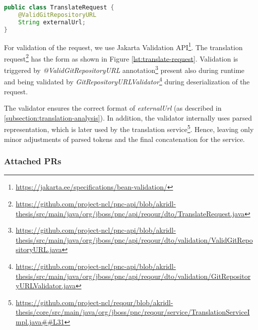 \documentclass[../main.tex]{subfiles}
\begin{document}
\begin{lstlisting}[language=Java, caption=Translate request, label={lst:translate-request}, numbers=none]
public class TranslateRequest {
    @ValidGitRepositoryURL
    String externalUrl;
}
\end{lstlisting}

For validation of the request, we use Jakarta Validation API\footnote{\url{https://jakarta.ee/specifications/bean-validation/}}. The translation request\footnote{\url{https://github.com/project-ncl/pnc-api/blob/akridl-thesis/src/main/java/org/jboss/pnc/api/reqour/dto/TranslateRequest.java}} has the form as shown in Figure \ref{lst:translate-request}. Validation is triggered by \textit{@ValidGitRepositoryURL} annotation\footnote{\url{https://github.com/project-ncl/pnc-api/blob/akridl-thesis/src/main/java/org/jboss/pnc/api/reqour/dto/validation/ValidGitRepositoryURL.java}} present also during runtime and being validated by \textit{GitRepositoryURLValidator}\footnote{\url{https://github.com/project-ncl/pnc-api/blob/akridl-thesis/src/main/java/org/jboss/pnc/api/reqour/dto/validation/GitRepositoryURLValidator.java}} during deserialization of the request.

The validator ensures the correct format of \textit{externalUrl} (as described in \ref{subsection:translation-analysis}). In addition, the validator internally uses parsed representation, which is later used by the translation service\footnote{\url{https://github.com/project-ncl/reqour/blob/akridl-thesis/core/src/main/java/org/jboss/pnc/reqour/service/TranslationServiceImpl.java##L31}}. Hence, leaving only minor adjustments of parsed tokens and the final concatenation for the service.

\subsubsection*{Attached PRs}

\end{document}
